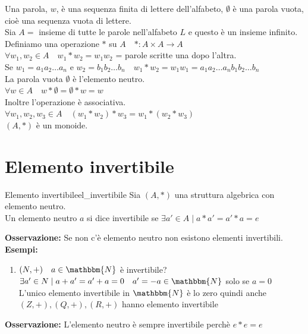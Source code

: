 \documentclass[12pt, letterpaper]{report}
\newcounter{definition}
\newcommand{\nmu}{}
\begin{document}
\begin{enumerate}
			Una parola, $w$, è una sequenza finita di lettere dell'alfabeto, $\emptyset$ è una parola vuota, cioè una sequenza vuota di lettere. \\
			Sia $A = $ insieme di tutte le parole nell'alfabeto $L$ e questo è un insieme infinito.\\
			Definiamo una operazione $*$ su $A \quad *:A \times A \to A$ \\
			$\forall w_1, w_2 \in A \quad w_1*w_2 = w_1w_2$ = parole scritte una dopo l'altra. \\
			Se $w_1 = a_1a_2\dots a_n$ e $w_2 = b_1b_2\dots b_n \quad w_1*w_2=w_1w_1=a_1a_2\dots a_nb_1b_2 \dots b_n$ \\
			La parola vuota $\emptyset$ è l'elemento neutro. \\
			$\forall w \in A \quad w * \emptyset = \emptyset * w = w$ \\
			Inoltre l'operazione è associativa. \\
			$\forall w_1, w_2, w_3 \in A \quad (w_1 * w_2) * w_3 = w_1 * (w_2 * w_3)$ \\
			$(A, *)$ è un monoide.
		\end{enumerate}
		\section{Elemento invertibile}
		\begin{definition}{\nmu Elemento invertibile}{el_invertibile}
			Sia $(A, *)$ una struttura algebrica con elemento neutro. \\
			Un elemento neutro $a$ si dice invertibile se $\exists a' \in A \mid a*a'=a'*a=e$
		\end{definition}
		\textbf{Osservazione:} Se non c'è elemento neutro non esistono elementi invertibili.
		\textbf{Esempi:}
		\begin{enumerate}
			\item $(N, +) \quad a \in \mathbbm{N}$ è invertibile? \\
			$\exists a' \in N \mid a+a'=a'+a=0 \quad a'=-a \in \mathbbm{N}$ solo se $a=0$ \\
			L'unico elemento invertibile in $\mathbbm{N}$ è lo zero quindi anche $(Z, +), (Q, +), (R, +)$ hanno elemento invertibile
		\end{enumerate}
		\textbf{Osservazione:} L'elemento neutro è sempre invertibile perchè $e*e=e$ \\
\end{document}
